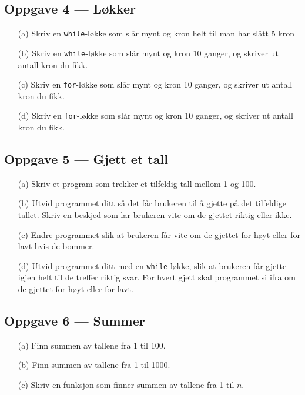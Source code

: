\documentclass[a4paper, 11pt, notitlepage]{article}
\begin{document}
\subsection*{Oppgave 4 --- Løkker}
\begin{itemize}
	\item[(a)] Skriv en \verb+while+-løkke som slår mynt og kron helt til man har slått 5 kron
	\item[(b)] Skriv en \verb+while+-løkke som slår mynt og kron 10 ganger, og skriver ut antall kron du fikk.
	\item[(c)] Skriv en \verb+for+-løkke som slår mynt og kron 10 ganger, og skriver ut antall kron du fikk.
	\item[(d)] Skriv en \verb+for+-løkke som slår mynt og kron 10 ganger, og skriver ut antall kron du fikk.
\end{itemize}

\subsection*{Oppgave 5 --- Gjett et tall}
\begin{itemize}
\item[(a)] Skriv et program som trekker et tilfeldig tall mellom 1 og 100.
\item[(b)] Utvid programmet ditt så det får brukeren til å gjette på det tilfeldige tallet. Skriv en beskjed som lar brukeren vite om de gjettet riktig eller ikke.
\item[(c)] Endre programmet slik at brukeren får vite om de gjettet for høyt eller for lavt hvis de bommer.
\item[(d)] Utvid programmet ditt med en \verb+while+-løkke, slik at brukeren får gjette igjen helt til de treffer riktig svar. For hvert gjett skal programmet si ifra om de gjettet for høyt eller for lavt.
\end{itemize}

\subsection*{Oppgave 6 --- Summer}
\begin{itemize}
	\item[(a)] Finn summen av tallene fra 1 til 100.
	\item[(b)] Finn summen av tallene fra 1 til 1000.
	\item[(c)] Skriv en funksjon som finner summen av tallene fra 1 til $n$.
\end{itemize}
\end{document}
